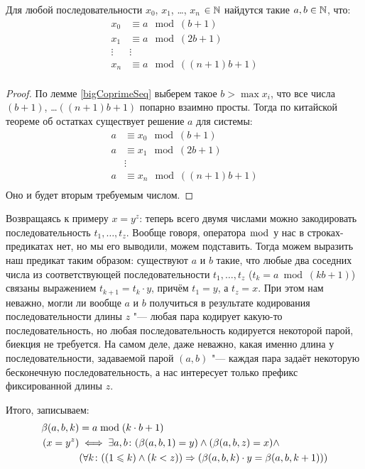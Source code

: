 \begin{lemma}
	Для любой последовательности $x_0$, $x_1$, \dots, $x_n$ $\in \mathbb{N}$ найдутся такие
	$a, b \in \mathbb{N}$, что:
	\begin{align*}
		x_0 &\equiv a \mod (b + 1) \\
		x_1 &\equiv a \mod (2b + 1) \\
		\vdots & \vdots \\
		x_n &\equiv a \mod ((n+1)b + 1) \\
	\end{align*}
\end{lemma}
\begin{proof}
	По лемме \ref{bigCoprimeSeq} выберем такое $b > \max x_i$, что все числа $(b+1)$, \dots $((n+1)b+1)$ попарно взаимно просты.
	Тогда по китайской теореме об остатках существует решение $a$ для системы:
	\begin{align*}
		a &\equiv x_0 \mod (b + 1) \\
		a &\equiv x_1 \mod (2b + 1) \\
		  & \vdots \\
		a &\equiv x_n \mod ((n+1)b + 1) \\
	\end{align*}
	Оно и будет вторым требуемым числом.
\end{proof}

Возвращаясь к примеру $x=y^z$: теперь всего двумя числами можно закодировать последовательность $t_1, \dots, t_z$.
Вообще говоря, оператора $\bmod$ у нас в строках-предикатах нет, но мы его выводили, можем подставить.
Тогда можем выразить наш предикат таким образом: существуют $a$ и $b$ такие, что любые два соседних числа из соответствующей последовательности
$t_1, \dots, t_z$ ($t_k = a \bmod (kb + 1)$) связаны выражением $t_{k+1}=t_k\cdot y$, причём $t_1=y$, а $t_z=x$.
При этом нам неважно, могли ли вообще $a$ и $b$ получиться в результате кодирования последовательности длины $z$ "--- любая
пара кодирует какую-то последовательность, но любая последовательность кодируется некоторой парой, биекция не требуется.
На самом деле, даже неважно, какая именно длина у последовательности, задаваемой парой $(a, b)$ "--- каждая пара задаёт некоторую бесконечную
последовательность, а нас интересует только префикс фиксированной длины $z$.

Итого, записываем:
\begin{align*}
	\beta(a, b, k) &= a \bmod (k \cdot b + 1) \\
	(x = y^z) &\iff \exists a, b \colon (\beta(a, b, 1)=y) \land (\beta(a, b, z)=x) \land \\
	&(\forall k \colon ((1 \leqslant k) \land (k < z)) \Rightarrow (\beta(a, b, k) \cdot y = \beta(a, b, k + 1)))
\end{align*}

